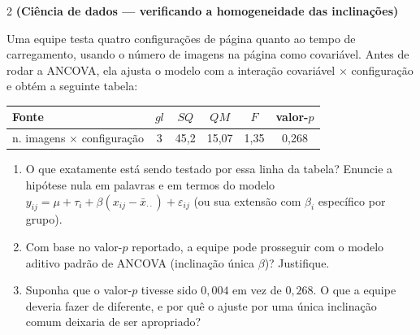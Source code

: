 \documentclass[11pt]{article}
\begin{document}
\begin{questao}{2} \textbf{(Ciência de dados --- verificando a homogeneidade das inclinações)}

Uma equipe testa quatro configurações de página quanto ao tempo de carregamento, usando o
número de imagens na página como covariável. Antes de rodar a ANCOVA, ela ajusta o modelo com a
interação covariável $\times$ configuração e obtém a seguinte tabela:

\begin{center}
\begin{tabular}{lccccc}
\toprule
Fonte & $gl$ & $SQ$ & $QM$ & $F$ & valor-$p$ \\
\midrule
n. imagens $\times$ configuração & 3 & 45{,}2 & 15{,}07 & 1{,}35 & 0{,}268 \\
\bottomrule
\end{tabular}
\end{center}

\begin{enumerate}[label=(\alph*)]
  \item O que exatamente está sendo testado por essa linha da tabela? Enuncie a hipótese nula em
    palavras e em termos do modelo $y_{ij} = \mu+\tau_i+\beta(x_{ij}-\bar x_{\cdot\cdot})+
    \varepsilon_{ij}$ (ou sua extensão com $\beta_i$ específico por grupo).
  \item Com base no valor-$p$ reportado, a equipe pode prosseguir com o modelo aditivo padrão de
    ANCOVA (inclinação única $\beta$)? Justifique.
  \item Suponha que o valor-$p$ tivesse sido $0{,}004$ em vez de $0{,}268$. O que a equipe deveria
    fazer de diferente, e por quê o ajuste por uma única inclinação comum deixaria de ser
    apropriado?
\end{enumerate}
\end{questao}
\end{document}
